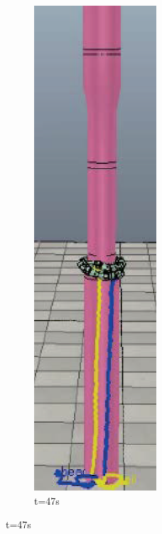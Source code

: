 \begin{figure}[htbp]
	\begin{subfigure}{0.3\textwidth}{
			\centering
			\includegraphics[height=0.18\textheight,width=0.5\textwidth]{figure/chap05/BSB/1m05s.eps}
			\caption{t=47s}
		}
	\end{subfigure}

\end{figure}
